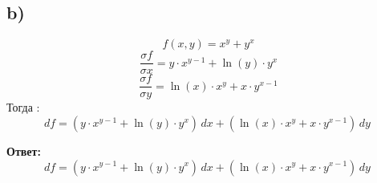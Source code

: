 \documentclass[a4paper,12pt]{article}
\begin{document}
\subsection*{b)}
\[
f(x, y) = x^y + y^x
\]
\[
\frac{\sigma f}{\sigma x} = y \cdot x^{y -1 } + \ln(y) \cdot y^x
\]
\[
\frac{\sigma f}{\sigma y} = \ln (x) \cdot x^y + x \cdot y^{x-1}
\]
Тогда :
\[
df = \left(y \cdot x^{y -1 } + \ln(y)\cdot y^x\right) \, dx + \left(\ln (x) \cdot x^y + x \cdot y^{x-1}\right) \, dy\
\]
{\Large \begin{center}
\textbf{Ответ: } 
\[
df = \left(y \cdot x^{y -1 } + \ln(y)\cdot y^x\right) \, dx + \left(\ln (x) \cdot x^y + x \cdot y^{x-1}\right) \, dy\
\]
\end{center}}
\end{document}
